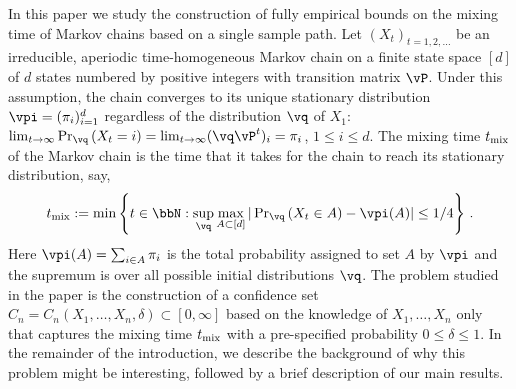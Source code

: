 

In this paper we study the construction of fully empirical bounds on the mixing time of Markov chains based on a single sample path.
Let $(X_t)_{t=1,2,\dots}$ be an irreducible, aperiodic time-homogeneous Markov chain on a finite state space $[d]$ of $d$ states numbered by positive integers with transition matrix $\vP$. Under this assumption, the chain converges to its unique stationary 
distribution $\vpi = (\pi_i)_{i=1}^d$ regardless of the distribution $\vq$ of $X_1$: 
$\lim_{t\to\infty} \Pr_{\vq}\Parens{X_t = i} = \lim_{t\to\infty} (\vq \vP^t)_i = \pi_i$, $1\le i \le d$.
The mixing time $t_{\operatorname{mix}}$ of the Markov chain is the time that it takes for the chain to reach its stationary distribution, say,
\[
  \tmix
  :=
  \min\Braces{
    t \in \bbN :
    \sup_{\vq}
    \max_{A\subset [d]} |\textstyle\Pr_{\vq}\Parens{ X_t \in A } - \vpi(A)|
    \leq 1/4
  }\,.
\]
Here $\vpi(A) = \sum_{i\in A} \pi_i$ is the total probability assigned to set $A$ by $\vpi$ and the supremum is over
all possible initial distributions $\vq$.
The problem studied in the paper is the construction of a confidence set $C_n = C_n(X_1,\dots,X_n,\delta) \subset [0,\infty]$ based on the knowledge of $X_1,\dots,X_n$ only that captures the mixing time $t_{\operatorname{mix}}$ with a pre-specified probability $0\le \delta \le 1$. 
In the remainder of the introduction, we describe the background of why this problem might be interesting, followed by a 
brief description of our main results.

